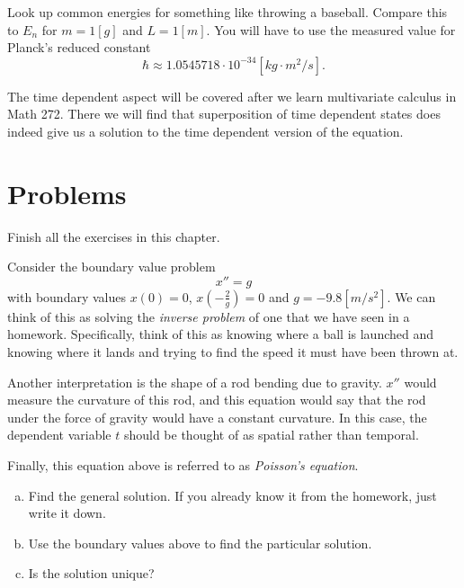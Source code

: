 \begin{exercise}
Look up common energies for something like throwing a baseball. Compare this to $E_n$ for $m=1[g]$ and $L=1[m]$. You will have to use the measured value for Planck's reduced constant
\[
\hbar \approx 1.0545718\cdot 10^{-34}[kg \cdot m^2 /s].
\]
\end{exercise}

\begin{remark}
    The time dependent aspect will be covered after we learn multivariate calculus in Math 272.  There we will find that superposition of time dependent states does indeed give us a solution to the time dependent version of the equation.
\end{remark}

\section*{Problems}

\begin{problem}
Finish all the exercises in this chapter.
\end{problem}

\begin{problem}
Consider the boundary value problem
\[
x''=g
\]
with boundary values $x(0)=0$, $x\left(-\frac{2}{g}\right)=0$ and $g=-9.8[m/s^2]$.  We can think of this as solving the \emph{inverse problem} of one that we have seen in a homework. Specifically, think of this as knowing where a ball is launched and knowing where it lands and trying to find the speed it must have been thrown at.

Another interpretation is the shape of a rod bending due to gravity.  $x''$ would measure the curvature of this rod, and this equation would say that the rod under the force of gravity would have a constant curvature. In this case, the dependent variable $t$ should be thought of as spatial rather than temporal.

Finally, this equation above is referred to as \emph{Poisson's equation}.
\begin{enumerate}[(a)]
    \item Find the general solution. If you already know it from the homework, just write it down.
    \item Use the boundary values above to find the particular solution.
    \item Is the solution unique?
\end{enumerate}
\end{problem}

